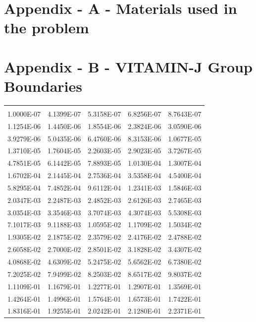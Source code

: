 \documentclass[12pt]{article}
\begin{document}
\newpage
\clearpage


\newpage
\clearpage
\section{Appendix - A - Materials used in the problem}

\newpage
\clearpage
\section{Appendix - B - VITAMIN-J Group Boundaries}
\label{appendix_b}
\begin{centering}
 \begin{table}[ht!]
  \begin{tabular}{| c  c  c  c  c |}
  \hline
  \\
  1.0000E-07 & 4.1399E-07 & 5.3158E-07 & 6.8256E-07 & 8.7643E-07\\
  1.1254E-06 & 1.4450E-06 & 1.8554E-06 & 2.3824E-06 & 3.0590E-06\\
  3.9279E-06 & 5.0435E-06 & 6.4760E-06 & 8.3153E-06 & 1.0677E-05\\
  1.3710E-05 & 1.7604E-05 & 2.2603E-05 & 2.9023E-05 & 3.7267E-05\\
  4.7851E-05 & 6.1442E-05 & 7.8893E-05 & 1.0130E-04 & 1.3007E-04\\
  1.6702E-04 & 2.1445E-04 & 2.7536E-04 & 3.5358E-04 & 4.5400E-04\\
  5.8295E-04 & 7.4852E-04 & 9.6112E-04 & 1.2341E-03 & 1.5846E-03\\
  2.0347E-03 & 2.2487E-03 & 2.4852E-03 & 2.6126E-03 & 2.7465E-03\\
  3.0354E-03 & 3.3546E-03 & 3.7074E-03 & 4.3074E-03 & 5.5308E-03\\
  7.1017E-03 & 9.1188E-03 & 1.0595E-02 & 1.1709E-02 & 1.5034E-02\\
  1.9305E-02 & 2.1875E-02 & 2.3579E-02 & 2.4176E-02 & 2.4788E-02\\
  2.6058E-02 & 2.7000E-02 & 2.8501E-02 & 3.1828E-02 & 3.4307E-02\\
  4.0868E-02 & 4.6309E-02 & 5.2475E-02 & 5.6562E-02 & 6.7380E-02\\
  7.2025E-02 & 7.9499E-02 & 8.2503E-02 & 8.6517E-02 & 9.8037E-02\\
  1.1109E-01 & 1.1679E-01 & 1.2277E-01 & 1.2907E-01 & 1.3569E-01\\
  1.4264E-01 & 1.4996E-01 & 1.5764E-01 & 1.6573E-01 & 1.7422E-01\\
  1.8316E-01 & 1.9255E-01 & 2.0242E-01 & 2.1280E-01 & 2.2371E-01\\

\end{tabular}
\end{table}
\end{centering}
\end{document}
